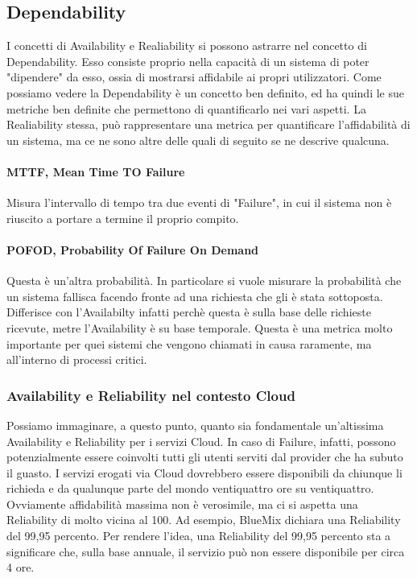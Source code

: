 \subsection{Dependability}
I concetti di Availability e Realiability si possono astrarre nel concetto di Dependability. Esso consiste proprio nella capacità di un sistema di poter "dipendere" da esso, ossia di mostrarsi affidabile ai propri utilizzatori. Come possiamo vedere la Dependability è un concetto ben definito, ed ha quindi le sue metriche ben definite che permettono di quantificarlo nei vari aspetti. La Realiability stessa, può rappresentare una metrica per quantificare l'affidabilità di un sistema, ma ce ne sono altre delle quali di seguito se ne descrive qualcuna.


\paragraph{MTTF, Mean Time TO Failure}
Misura l'intervallo di tempo tra due eventi di "Failure", in cui il sistema non è riuscito a portare a termine il proprio compito.

\paragraph{POFOD, Probability Of Failure On Demand} 
Questa è un'altra probabilità. In particolare si vuole misurare la probabilità che un sistema fallisca facendo fronte ad una richiesta che gli è stata sottoposta. Differisce con l'Availabilty infatti perchè questa è sulla base delle richieste ricevute, metre l'Availability è su base temporale. Questa è una metrica molto importante per quei sistemi che vengono chiamati in causa raramente, ma all'interno di processi critici.


\subsubsection{Availability e Reliability nel contesto Cloud}
Possiamo immaginare, a questo punto, quanto sia fondamentale un'altissima Availability e Reliability per i servizi Cloud. In caso di Failure, infatti, possono potenzialmente essere coinvolti tutti gli utenti serviti dal provider che ha subuto il guasto. I servizi erogati via Cloud dovrebbero essere disponibili da chiunque li richieda e da qualunque parte del mondo ventiquattro ore su ventiquattro. Ovviamente affidabilità massima non è verosimile, ma ci si aspetta una Reliability di molto vicina al 100. Ad esempio, BlueMix dichiara una Reliability del 99,95 percento. Per rendere l'idea, una Reliability del 99,95 percento sta a significare che, sulla base annuale, il servizio può non essere disponibile per circa 4 ore. 

